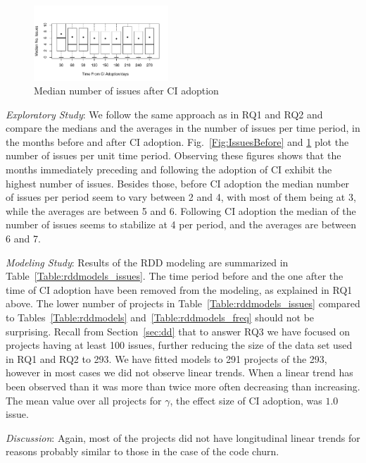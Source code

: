 \begin{figure}[t]
\centering
\includegraphics[width=0.45\textwidth, clip=true, trim=0 15 15 50]{issues_after.pdf}
\caption{Median number of issues after CI adoption}
\label{Fig:IssuesAfter}
\end{figure}

\smallskip\noindent \emph{Exploratory Study}:
We follow the same approach as in RQ1 and RQ2 and compare the 
medians and the averages in the number of issues per time period, in the 
months before and after CI adoption.
Fig.~\ref{Fig:IssuesBefore} and \ref{Fig:IssuesAfter} plot the number of 
issues per unit time period.
Observing these figures shows that the months immediately preceding 
and following the adoption of CI exhibit the highest number of issues.
Besides those, before CI adoption the median number of issues per period seem to vary between 2 and 4, with most of them being at 3, while the averages are between 5 and 6.
Following CI adoption the median of the number of issues seems to 
stabilize at 4 per period, and the averages are between 6 and 7.



\smallskip\noindent \emph{Modeling Study}:
Results of the RDD modeling are summarized in Table~\ref{Table:rddmodels_issues}.
The time period before and the one after the time of CI adoption have been removed from the modeling, as explained in RQ1 above.
The lower number of projects in Table~\ref{Table:rddmodels_issues} 
compared to Tables~\ref{Table:rddmodels} and~\ref{Table:rddmodels_freq} 
should not be surprising. 
Recall from Section~\ref{sec:dd} that to answer RQ3 we have focused on 
projects having at least 100 issues, further reducing the size of the data set 
used in RQ1 and RQ2 to 293.
We have fitted models to 291 projects of the 293, however in most cases we 
did not observe linear trends.
When a linear trend has been observed than it was more than twice more 
often decreasing than increasing.
The mean value over all projects for $\gamma$, the effect size of CI adoption, 
was $1.0$ issue.


\smallskip\noindent \emph{Discussion}:
Again, most of the projects did not have longitudinal linear trends for reasons probably similar to those in the case of the code churn.


